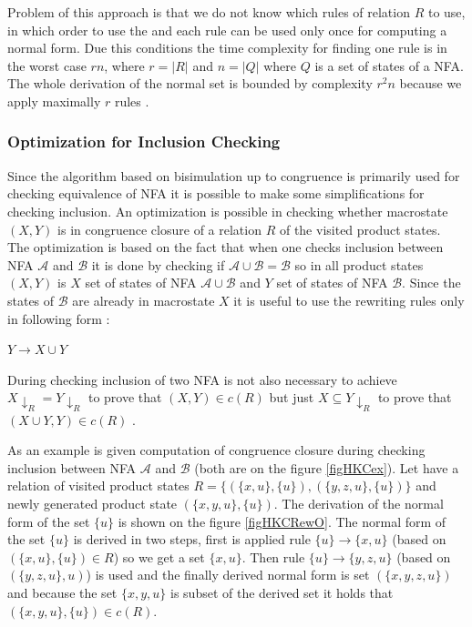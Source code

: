 Problem of this approach is that we do not know which rules of relation $R$ to use, in which order to use the 
and each rule can be used only once for computing a normal form. 
Due this conditions the time complexity for finding one rule is in the worst case $rn$, where $r=|R|$ and $n=|Q|$ where $Q$ is a set of states of a NFA.
The whole derivation of the normal set is bounded by complexity $r^2 n$ because we apply maximally $r$ rules \cite{popl13}.

\subsubsection{Optimization for Inclusion Checking}
\label{congrOpt}
Since the algorithm based on bisimulation up to congruence is primarily used for checking equivalence of NFA it is possible to make some simplifications for
checking inclusion. An optimization is possible in checking whether macrostate $(X,Y)$ is in congruence closure of a relation $R$ of the visited
product states. The optimization
is based on the fact that when one checks inclusion between NFA $\mathcal{A}$ and $\mathcal{B}$ it is done by checking if $\mathcal{A}\cup\mathcal{B}=
\mathcal{B}$ so in all product states $(X,Y)$ is $X$ set of states of NFA $\mathcal{A}\cup\mathcal{B}$ and $Y$ set of states of NFA $\mathcal{B}$. Since the
states of $\mathcal{B}$ are already in macrostate $X$ it is useful to use the rewriting rules only in following form \cite{popl13}:
\begin{center}
$Y\rightarrow X\cup Y$
\end{center}
During checking inclusion of two NFA is not also necessary to achieve $X{\downarrow_R}=Y{\downarrow_R}$ to prove that $(X,Y)\in c(R)$ 
but just $X \subseteq Y{\downarrow_R}$ to prove that $(X\cup Y,Y)\in c(R)$ \cite{popl13}.

As an example is given computation of congruence closure during checking inclusion between NFA $\mathcal{A}$ and $\mathcal{B}$ (both are on the figure 
\ref{figHKCex}). Let have a relation of visited product states $R=\{(\{x,u\},\{u\}),(\{y,z,u\},\{u\})\}$ and newly generated product state $(\{x,y,u\},\{u\})$. The
derivation of the normal form of the set $\{u\}$ is shown on the figure \ref{figHKCRewO}. 
The normal form of the set $\{u\}$ is derived in two steps, first is applied rule $\{u\}\rightarrow\{x,u\}$ (based on $(\{x,u\},\{u\})\in R$) 
so we get a set $\{x,u\}$. Then rule $\{u\}\rightarrow\{y,z,u\}$ (based on $(\{y,z,u\},u)$) is used and the finally derived normal form is set $(\{x,y,z,u\})$ 
and because the set $\{x,y,u\}$ is subset of the derived set it holds that $(\{x,y,u\},\{u\})\in c(R)$.

